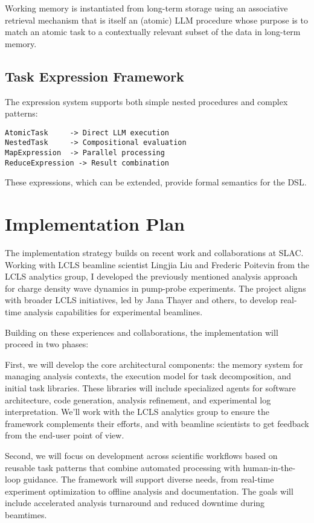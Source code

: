 \documentclass{article}
\begin{document}
Working memory is instantiated from long-term storage using an associative retrieval mechanism that is itself an (atomic) LLM procedure whose purpose is to match an atomic task to a contextually relevant subset of the data in long-term memory.

\subsection{Task Expression Framework}
The expression system supports both simple nested procedures and complex patterns:

\begin{lstlisting}[caption=Task Expression Types]
AtomicTask     -> Direct LLM execution
NestedTask     -> Compositional evaluation  
MapExpression  -> Parallel processing
ReduceExpression -> Result combination
\end{lstlisting}

These expressions, which can be extended, provide formal semantics for the DSL.

\section{Implementation Plan}
The implementation strategy builds on recent work and collaborations at SLAC. Working with LCLS beamline scientist Lingjia Liu and Frederic Poitevin from the LCLS analytics group, I developed the previously mentioned analysis approach for charge density wave dynamics in pump-probe experiments. The project aligns with broader LCLS initiatives, led by Jana Thayer and others, to develop real-time analysis capabilities for experimental beamlines.

Building on these experiences and collaborations, the implementation will proceed in two phases:

First, we will develop the core architectural components: the memory system for managing analysis contexts, the execution model for task decomposition, and initial task libraries. These libraries will include specialized agents for software architecture, code generation, analysis refinement, and experimental log interpretation. We'll work with the LCLS analytics group to ensure the framework complements their efforts, and with beamline scientists to get feedback from the end-user point of view.

Second, we will focus on development across scientific workflows based on reusable task patterns that combine automated processing with human-in-the-loop guidance. The framework will support diverse needs, from real-time experiment optimization to offline analysis and documentation. The goals will include accelerated analysis turnaround and reduced downtime during beamtimes.
\end{document}
